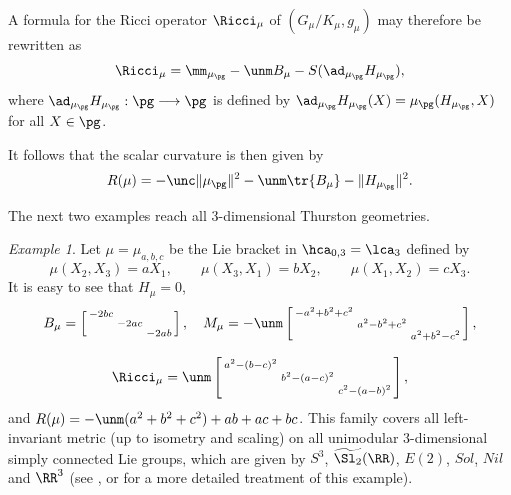 \documentclass[11pt]{amsart}
\theoremstyle{plain}
\theoremstyle{definition}
\theoremstyle{remark}
\newtheorem{example}[theorem]{Example}
\begin{document}
A formula for the Ricci operator $\Ricci_\mu$ of $\left(G_{\mu}/K_{\mu},g_\mu\right)$ may
therefore be rewritten as
\begin{equation}\label{ricci2}
\Ricci_\mu=\mm_{\mu_{\pg}}-\unm B_{\mu}-S(\ad_{\mu_{\pg}}{H_{\mu_{\pg}}}),
\end{equation}
where $\ad_{\mu_{\pg}}{H_{\mu_{\pg}}}:\pg\longrightarrow\pg$ is defined by
$\ad_{\mu_{\pg}}{H_{\mu_{\pg}}}(X)=\mu_{\pg}(H_{\mu_{\pg}},X)$ for all $X\in\pg$.

It follows that the scalar curvature is then given by
\begin{equation}\label{scalar}
R(\mu)=-\unc\|\mu_{\pg}\|^2-\unm\tr{B_\mu}-\| H_{\mu_{\pg}}\|^2.
\end{equation}


The next two examples reach all $3$-dimensional Thurston geometries.

\begin{example}\label{ex0-3ricci}
Let $\mu=\mu_{a,b,c}$ be the Lie bracket in $\hca_{0,3}=\lca_3$ defined by
$$
\mu(X_2,X_3)=aX_1, \qquad \mu(X_3,X_1)=bX_2, \qquad \mu(X_1,X_2)=cX_3.
$$
It is easy to see that $H_{\mu}=0$,
$$
\begin{array}{c}
B_\mu=\left[\begin{smallmatrix} -2bc&&\\ &-2ac& \\ && -2ab\end{smallmatrix}\right], \quad
M_\mu=-\unm\left[\begin{smallmatrix} -a^2+b^2+c^2&&\\ &a^2-b^2+c^2& \\ &&a^2+b^2-c^2\end{smallmatrix}\right], \\ \\
\Ricci_\mu=\unm\left[\begin{smallmatrix} a^2-(b-c)^2&&\\ &b^2-(a-c)^2& \\ &&c^2-(a-b)^2\end{smallmatrix}\right],
\end{array}
$$
and $R(\mu)=-\unm(a^2+b^2+c^2)+ab+ac+bc$.  This family covers all left-invariant metric (up to isometry and scaling) on all unimodular $3$-dimensional simply connected Lie groups, which are given by $S^3$, $\widetilde{\Sl_2}(\RR)$, $E(2)$, $Sol$, $Nil$ and $\RR^3$ (see \cite{Mln}, \cite{GlcPyn} or \cite[Example 3.2]{spacehm} for a more detailed treatment of this example).
\end{example}
\end{document}
